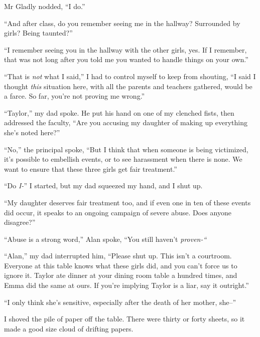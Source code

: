 Mr Gladly nodded, ``I do.''



``And after class, do you remember seeing me in the hallway?  Surrounded by girls?  Being taunted?''



``I remember seeing you in the hallway with the other girls, yes.  If I remember, that was not long after you told me you wanted to handle things on your own.''



``That is \emph{not} what I said,'' I had to control myself to keep from shouting, ``I said I thought \emph{this} situation here, with all the parents and teachers gathered, would be a farce.  So far, you're not proving me wrong.''



``Taylor,'' my dad spoke.  He put his hand on one of my clenched fists, then addressed the faculty, ``Are you accusing my daughter of making up everything she's noted here?''



``No,'' the principal spoke, ``But I think that when someone is being victimized, it's possible to embellish events, or to see harassment when there is none.  We want to ensure that these three girls get fair treatment.''



``Do \emph{I-}'' I started, but my dad squeezed my hand, and I shut up.



``My daughter deserves fair treatment too, and if even one in ten of these events did occur, it speaks to an ongoing campaign of severe abuse.  Does anyone disagree?''



``Abuse is a strong word,'' Alan spoke, ``You still haven't \emph{proven-``}



``Alan,'' my dad interrupted him, ``Please shut up.  This isn't a courtroom.  Everyone at this table knows what these girls did, and you can't force us to ignore it.  Taylor ate dinner at your dining room table a hundred times, and Emma did the same at ours.  If you're implying Taylor is a liar, say it outright.''



``I only think she's sensitive, especially after the death of her mother, she--''



I shoved the pile of paper off the table.  There were thirty or forty sheets, so it made a good size cloud of drifting papers.



